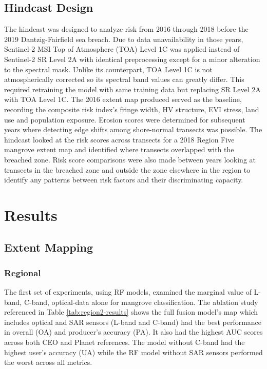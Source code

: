 \documentclass[final-report]{report-template}
\begin{document}
\subsection{Hindcast Design}
The hindcast was designed to analyze risk from 2016 through 2018 before the 2019 Dantzig-Fairfield sea breach. Due to data unavailability in those years, Sentinel-2 MSI Top of Atmosphere (TOA) Level 1C was applied instead of  Sentinel-2 SR Level 2A with identical preprocessing except for a minor alteration to the spectral mask. Unlike its counterpart, TOA Level 1C is not atmospherically corrected so its spectral band values can greatly differ. This required retraining the model with same training data but replacing SR Level 2A with TOA Level 1C. The 2016 extent map produced served as the baseline, recording the composite risk index's fringe width, HV structure, EVI stress, land use and population exposure. Erosion scores were determined for subsequent years where detecting edge shifts among shore-normal transects was possible. The hindcast looked at the risk scores across transects for a 2018 Region Five mangrove extent map and identified where transects overlapped with the breached zone.  Risk score comparisons were also made between years looking at transects in the breached zone and outside the zone elsewhere in the region to identify any patterns between risk factors and their discriminating capacity. 

\section{Results}
\subsection{Extent Mapping}
\subsubsection{Regional}
The first set of experiments, using RF models, examined the marginal value of L-band, C-band, optical-data alone for mangrove classification. The ablation study referenced in Table \ref{tab:region2-results} shows the full fusion model's map which includes optical and SAR sensors (L-band and C-band) had the best performance in overall (OA) and producer's accuracy (PA). It also had the highest AUC scores across both CEO and Planet references. The model without C-band had the highest user's accuracy (UA) while the RF model without SAR sensors performed the worst across all metrics.

\end{document}
